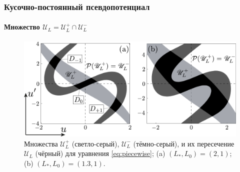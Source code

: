 \documentclass [10pt] {beamer}
\begin{document}
\begin{frame}
	\frametitle{Кусочно-постоянный псевдопотенциал}
	\framesubtitle{Множество $\mathscr{U}_L = \mathscr{U}_L^+ \cap \mathscr{U}_L^-$}
	
	\begin{figure}
	\includegraphics[width = \textwidth]{pic/island set for piecewise equation.pdf}
	\caption{
		Множества $\mathscr{U}_L^+$ (светло-серый), $\mathscr{U}_L^-$ (тёмно-серый), и их пересечение $\mathscr{U}_L$ (чёрный) для уравнения \eqref{eq:piecewise}; (a) $(L_*, L_0) = (2, 1)$; (b) $(L_*, L_0) = (1.3, 1)$.
	}
	\end{figure}
\end{frame}
\end{document}
